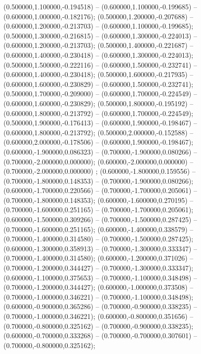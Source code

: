  (0.500000,1.100000,-0.194518) -- (0.600000,1.100000,-0.199685) -- (0.600000,1.000000,-0.182176);
 (0.500000,1.200000,-0.207688) -- (0.600000,1.200000,-0.213703) -- (0.600000,1.100000,-0.199685);
 (0.500000,1.300000,-0.216815) -- (0.600000,1.300000,-0.224013) -- (0.600000,1.200000,-0.213703);
 (0.500000,1.400000,-0.221687) -- (0.600000,1.400000,-0.230418) -- (0.600000,1.300000,-0.224013);
 (0.500000,1.500000,-0.222116) -- (0.600000,1.500000,-0.232741) -- (0.600000,1.400000,-0.230418);
 (0.500000,1.600000,-0.217935) -- (0.600000,1.600000,-0.230829) -- (0.600000,1.500000,-0.232741);
 (0.500000,1.700000,-0.209000) -- (0.600000,1.700000,-0.224549) -- (0.600000,1.600000,-0.230829);
 (0.500000,1.800000,-0.195192) -- (0.600000,1.800000,-0.213792) -- (0.600000,1.700000,-0.224549);
 (0.500000,1.900000,-0.176413) -- (0.600000,1.900000,-0.198467) -- (0.600000,1.800000,-0.213792);
 (0.500000,2.000000,-0.152588) -- (0.600000,2.000000,-0.178506) -- (0.600000,1.900000,-0.198467);
 (0.600000,-1.900000,0.086323) -- (0.700000,-1.900000,0.080266) -- (0.700000,-2.000000,0.000000);
 (0.600000,-2.000000,0.000000) -- (0.700000,-2.000000,0.000000) ;
 (0.600000,-1.800000,0.159556) -- (0.700000,-1.800000,0.148353) -- (0.700000,-1.900000,0.080266);
 (0.600000,-1.700000,0.220566) -- (0.700000,-1.700000,0.205061) -- (0.700000,-1.800000,0.148353);
 (0.600000,-1.600000,0.270195) -- (0.700000,-1.600000,0.251165) -- (0.700000,-1.700000,0.205061);
 (0.600000,-1.500000,0.309266) -- (0.700000,-1.500000,0.287425) -- (0.700000,-1.600000,0.251165);
 (0.600000,-1.400000,0.338579) -- (0.700000,-1.400000,0.314580) -- (0.700000,-1.500000,0.287425);
 (0.600000,-1.300000,0.358913) -- (0.700000,-1.300000,0.333347) -- (0.700000,-1.400000,0.314580);
 (0.600000,-1.200000,0.371026) -- (0.700000,-1.200000,0.344427) -- (0.700000,-1.300000,0.333347);
 (0.600000,-1.100000,0.375653) -- (0.700000,-1.100000,0.348498) -- (0.700000,-1.200000,0.344427);
 (0.600000,-1.000000,0.373508) -- (0.700000,-1.000000,0.346221) -- (0.700000,-1.100000,0.348498);
 (0.600000,-0.900000,0.365286) -- (0.700000,-0.900000,0.338235) -- (0.700000,-1.000000,0.346221);
 (0.600000,-0.800000,0.351656) -- (0.700000,-0.800000,0.325162) -- (0.700000,-0.900000,0.338235);
 (0.600000,-0.700000,0.333268) -- (0.700000,-0.700000,0.307601) -- (0.700000,-0.800000,0.325162);
